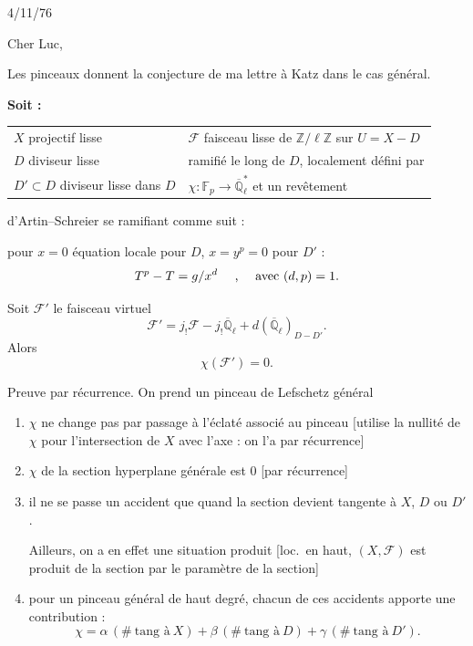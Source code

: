 \documentclass[11pt,a4paper]{article}
\theoremstyle{plain}
\theoremstyle{definition}
\begin{document}
\begin{flushright}
4/11/76
\end{flushright}

\vspace{0.5cm}

\noindent Cher Luc,

\vspace{0.5cm}

Les pinceaux donnent la conjecture de ma lettre \`a Katz dans le cas g\'en\'eral.

\vspace{0.3cm}

\noindent\textbf{Soit :}
\begin{center}
\begin{tabular}{p{5cm}p{7cm}}
$X$ projectif lisse & $\mathcal{F}$ faisceau lisse de $\mathbb{Z}/\ell\mathbb{Z}$ sur $U = X - D$ \\
$D$ diviseur lisse & ramifi\'e le long de $D$, localement d\'efini par \\
$D' \subset D$ diviseur lisse dans $D$ & $\chi : \mathbb{F}_p \to \overline{\mathbb{Q}}_\ell^*$ et un rev\^etement \\
\end{tabular}
\end{center}

d'Artin--Schreier se ramifiant comme suit :
\begin{center}
pour $x = 0$ \'equation locale pour $D$, \quad $x = y^p = 0$ pour $D'$ :
\[
T^p - T = g/x^d \text{ \quad , \quad avec } (d,p) = 1.
\]
\end{center}

\vspace{0.3cm}

Soit $\mathcal{F}'$ le faisceau virtuel
\[
\mathcal{F}' = j_! \mathcal{F} - j_! \overline{\mathbb{Q}}_\ell + d(\overline{\mathbb{Q}}_\ell)_{D-D'}.
\]
Alors
\[
\chi(\mathcal{F}') = 0.
\]

Preuve par r\'ecurrence. On prend un pinceau de Lefschetz g\'en\'eral

\begin{enumerate}[label=\alph*)]
\item $\chi$ ne change pas par passage \`a l'\'eclat\'e associ\'e au pinceau [utilise la nullit\'e de $\chi$ pour l'intersection de $X$ avec l'axe : on l'a par r\'ecurrence]

\item $\chi$ de la section hyperplane g\'en\'erale est $0$ [par r\'ecurrence]

\item il ne se passe un accident que quand la section devient tangente \`a $X$, $D$ ou $D'$.

Ailleurs, on a en effet une situation produit [loc.\ en haut, $(X,\mathcal{F})$ est produit de la section par le param\`etre de la section]

\item pour un pinceau g\'en\'eral de haut degr\'e, chacun de ces accidents apporte une contribution :
\[
\chi = \alpha\,(\#~\text{tang \`a}~X) + \beta\,(\#~\text{tang \`a}~D) + \gamma\,(\#~\text{tang \`a}~D').
\]
\end{enumerate}
\end{document}
